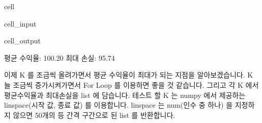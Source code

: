\documentclass[letterpaper,10pt,english]{jupyterBook}
\begin{document}
\begin{sphinxuseclass}{cell}
\begin{sphinxVerbatimInput}
\begin{sphinxuseclass}{cell_input}
\begin{sphinxVerbatim}[commandchars=\\\{\}]
     \PYG{p}{[}\PYG{p}{[}\PYG{p}{]}\PYG{p}{]}\PYG{p}{[}\PYG{p}{]} \PYG{p}{[}\PYG{p}{[}\PYG{p}{]}\PYG{p}{]}\PYG{p}{[}\PYG{p}{]}

    

\end{sphinxVerbatim}

\end{sphinxuseclass}\end{sphinxVerbatimInput}
\begin{sphinxVerbatimOutput}

\begin{sphinxuseclass}{cell_output}
\begin{sphinxVerbatim}[commandchars=\\\{\}]
 평균 수익율: 100.20\PYGZpc{} 최대 손실: 95.74\PYGZpc{}
\end{sphinxVerbatim}

\end{sphinxuseclass}\end{sphinxVerbatimOutput}

\end{sphinxuseclass}
\sphinxAtStartPar
 이제 K 를 조금씩 올려가면서 평균 수익율이 최대가 되는 지점을 알아보겠습니다. K 늘 조금씩 증가시켜가면서 For Loop 를 이용하면 좋을 것 같습니다. 그리고 각 K 에서 평균수익율과 최대손실을 list 에 담습니다.
테스트 할 K 는 numpy 에서 제공하는 linspace(시작 값, 종료 값) 를 이용합니다. linspace 는 num(인수 중 하나) 을 지정하지 않으면 50개의 등 간격 구간으로 된 list 를 반환합니다.
\end{document}
